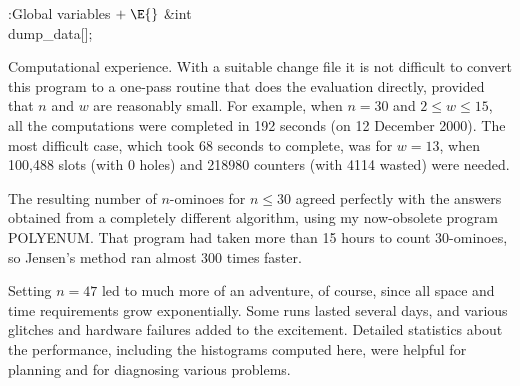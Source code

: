 \B{}:Global variables\X${}\mathrel+\E{}$\6
\&{int} \\{dump\_data}[];\par
\fi

Computational experience. With a suitable change file
it is not difficult to convert this program to a one-pass routine
that does the evaluation directly, provided that $n$ and $w$ are
reasonably small. For example, when $n=30$ and $2\le w\le15$,
all the computations were completed in 192 seconds (on 12 December 2000).
The most difficult case, which took 68 seconds to complete, was
for $w=13$, when
100,488 slots (with 0 holes)
and 218980 counters (with 4114 wasted)
were needed.

The resulting number of $n$-ominoes for $n\le30$ agreed perfectly with the
answers obtained from a completely different algorithm, using my now-obsolete
program {\mc POLYENUM}. That program had taken more than 15 hours
to count 30-ominoes, so Jensen's method ran almost 300 times faster.

Setting $n=47$ led to much more of an adventure, of course, since
all space and time requirements grow exponentially. Some runs lasted
several days, and various glitches and hardware failures added to the
excitement. Detailed statistics about the performance, including the
histograms computed here, were helpful for planning and
for diagnosing various problems.

